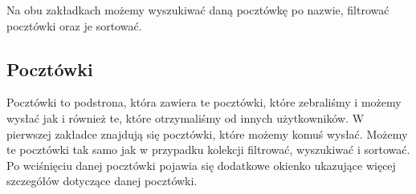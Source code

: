 \documentclass[a4paper,twoside,12pt]{book}
\begin{document}
Na obu zakładkach możemy wyszukiwać daną pocztówkę po nazwie, filtrować pocztówki oraz je sortować. 

\subsection{Pocztówki}
Pocztówki to podstrona, która zawiera te pocztówki, które zebraliśmy i możemy wysłać jak i również te, które otrzymaliśmy od innych użytkowników. W pierwszej zakładce znajdują się pocztówki, które możemy komuś wysłać. Możemy te pocztówki tak samo jak w przypadku kolekcji filtrować, wyszukiwać i sortować. Po wciśnięciu danej pocztówki pojawia się dodatkowe okienko ukazujące więcej szczegółów dotyczące danej pocztówki. 

\begin{figure}[H]
  \centering
  \begin{minipage}[b]{0.49\textwidth}

\end{minipage}
\end{figure}
\end{document}

